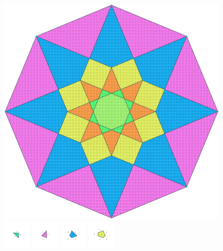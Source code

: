 \documentclass[text.tex]{subfiles}
\begin{document}
\clearpage
\pagestyle{fancy}
\fancyhf{}
\begin{figure}[h!]
\centering
\includegraphics[width=1\textwidth]{img/results/octagon/octagon_170710_(1_1alpha_2).pdf}
\includegraphics[width=0.12\textwidth]{img/results/octagon/octagon_170710_(1_1alpha_2)_001.pdf}
\includegraphics[width=0.12\textwidth]{img/results/octagon/octagon_170710_(1_1alpha_2)_002.pdf}
\includegraphics[width=0.12\textwidth]{img/results/octagon/octagon_170710_(1_1alpha_2)_003.pdf}
\includegraphics[width=0.12\textwidth]{img/results/octagon/octagon_170710_(1_1alpha_2)_004.pdf}

\end{figure}
\end{document}
